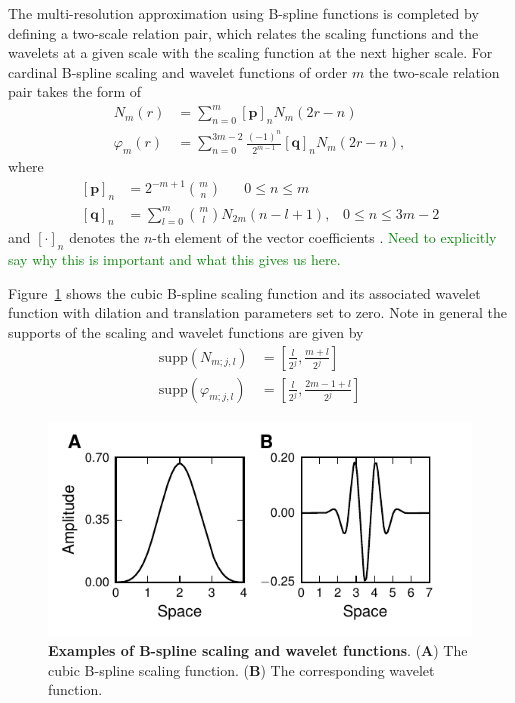 \documentclass[review,authoryear,3p]{elsarticle}
\newcommand{\dean}[1]{\textcolor{green}{#1}}
\begin{document}
The multi-resolution approximation using B-spline functions is completed by defining a two-scale relation pair, which relates the scaling functions and the wavelets at a given scale with the scaling function at the next higher scale. For cardinal B-spline scaling and wavelet functions of order $m$ the two-scale relation pair takes the form of
\begin{align}
 N_{m}\left(r\right)&=\sum_{n=0}^{m} \left[\mathbf p\right]_n N_{m}\left(2r-n\right) \label{eq:MRA-TwoScalepair1} \\
  \varphi_{m}\left(r\right) &= \sum_{n=0}^{3m-2} \frac{\left(-1\right)^n}{2^{m-1}} \left[\mathbf q\right]_n N_{m}\left(2r-n\right)\label{eq:MRA-TwoScalepair2},
 \end{align}
where 
 \begin{align}
\left[\mathbf p\right]_n&=2^{-m+1} \binom{m}{n} \quad \text{ $0\le n\le m$} \label{eq:MRA-TwoScalepair1coefs}\\
\left[\mathbf q\right]_n&= \sum_{l=0}^{m} \binom{m}{l} N_{2m}\left(n-l+1\right), \,  \text{ $0\le n\le 3m-2$}\label{eq:MRA-TwoScalepair2coefs}
 \end{align}
and $\left[\cdot\right]_n$ denotes the $n$-th element of the vector coefficients \citep{Chui1992}. \dean{Need to explicitly say why this is important and what this gives us here.}

Figure~\ref{fig:MRA-Figure1} shows the cubic B-spline scaling function and its associated wavelet function with dilation and translation parameters set to zero. Note in general the supports of the scaling and wavelet functions are given by 
\begin{align}
	\mathrm{supp}(N_{m;j,l})&=\left[\frac{l}{2^j},\frac{m+l}{2^j}\right] \\  
  \mathrm{supp}(\varphi_{m;j,l})&=\left[\frac{l}{2^j},\frac{2m-1+l}{2^j}\right] 
	\end{align} 
\begin{figure}[!t]
\centering
\includegraphics{./Graph/Figure1.pdf}
\caption{{\bf Examples of B-spline scaling and wavelet functions}. (\textbf{A}) The cubic B-spline scaling function. (\textbf{B}) The corresponding wavelet function.}
\label{fig:MRA-Figure1}
\end{figure}
\end{document}
